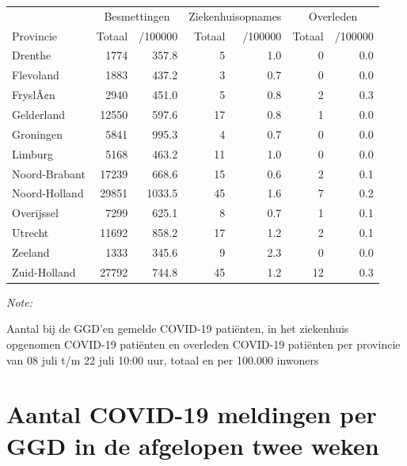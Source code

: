 \documentclass[
  english,
  man,floatsintext]{apa6}
\begin{document}
\begin{table}
\centering
\begin{threeparttable}
\begin{tabular}{lrrrrrr}
\toprule
\multicolumn{1}{c}{ } & \multicolumn{2}{c}{Besmettingen} & \multicolumn{2}{c}{Ziekenhuisopnames} & \multicolumn{2}{c}{Overleden} \\
\cmidrule(l{3pt}r{3pt}){2-3} \cmidrule(l{3pt}r{3pt}){4-5} \cmidrule(l{3pt}r{3pt}){6-7}
Provincie & Totaal & /100000 & Totaal & /100000 & Totaal & /100000\\
\midrule
Drenthe & 1774 & 357.8 & 5 & 1.0 & 0 & 0.0\\
Flevoland & 1883 & 437.2 & 3 & 0.7 & 0 & 0.0\\
FryslÃ¢n & 2940 & 451.0 & 5 & 0.8 & 2 & 0.3\\
Gelderland & 12550 & 597.6 & 17 & 0.8 & 1 & 0.0\\
Groningen & 5841 & 995.3 & 4 & 0.7 & 0 & 0.0\\
Limburg & 5168 & 463.2 & 11 & 1.0 & 0 & 0.0\\
Noord-Brabant & 17239 & 668.6 & 15 & 0.6 & 2 & 0.1\\
Noord-Holland & 29851 & 1033.5 & 45 & 1.6 & 7 & 0.2\\
Overijssel & 7299 & 625.1 & 8 & 0.7 & 1 & 0.1\\
Utrecht & 11692 & 858.2 & 17 & 1.2 & 2 & 0.1\\
Zeeland & 1333 & 345.6 & 9 & 2.3 & 0 & 0.0\\
Zuid-Holland & 27792 & 744.8 & 45 & 1.2 & 12 & 0.3\\
\bottomrule
\end{tabular}
\begin{tablenotes}
\item \textit{Note: } 
\item Aantal bij de GGD’en gemelde COVID-19 patiënten, in het ziekenhuis opgenomen COVID-19 patiënten en overleden COVID-19 patiënten per provincie van 08 juli t/m 22 juli 10:00 uur, totaal en per 100.000 inwoners
\end{tablenotes}
\end{threeparttable}
\end{table}

\newpage

\hypertarget{aantal-covid-19-meldingen-per-ggd-in-de-afgelopen-twee-weken}{%
\section{Aantal COVID-19 meldingen per GGD in de afgelopen twee weken}\label{aantal-covid-19-meldingen-per-ggd-in-de-afgelopen-twee-weken}}
\end{document}
